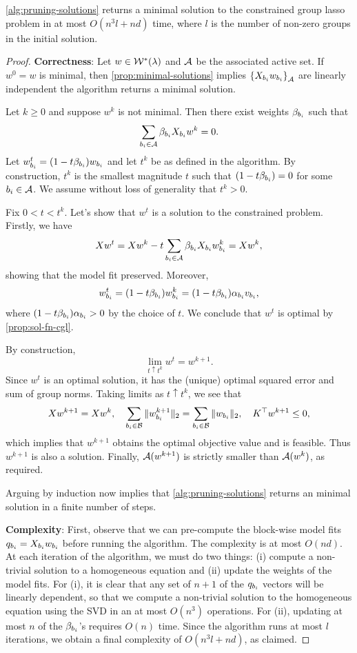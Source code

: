 \begin{proposition}\label{prop:pruning-correctness}
	\cref{alg:pruning-solutions} returns a minimal solution to the
	constrained group lasso problem in at most \( O(n^3l + nd) \)
	time, where \( l \) is the number of non-zero groups in the
	initial solution.
\end{proposition}
\begin{proof}
	\textbf{Correctness}:
	Let \( w \in \mathcal{W}^*(\lambda) \)
	and \( \mathcal{A} \) be the associated active set.
	If \( w^0 = w \) is minimal, then \cref{prop:minimal-solutions}
	implies \( \left\{X_{b_i} w_{b_i}\right\}_{\mathcal{A}} \) are linearly independent
	the algorithm returns a minimal solution.

	Let \( k \geq 0 \) and suppose \( w^k \) is not minimal.
	Then there exist weights \( \beta_{b_i} \) such that
	\[
		\sum_{{b_i} \in \mathcal{A}} \beta_{b_i} X_{b_i} w^k = 0.
	\]
	Let \( w_{b_i}^t = (1 - t \beta_{b_i}) w_{b_i} \) and let \( t^k \)
	be as defined in the algorithm.
	By construction, \( t^k \) is the smallest magnitude \( t \) such that
	\( (1 - t \beta_{b_i}) = 0 \) for some \( {b_i} \in \mathcal{A} \).
	We assume without loss of generality that \( t^k > 0 \).

	Fix \( 0 < t < t^k \). Let's show that \( w^t \) is a solution to the
	constrained problem.
	Firstly, we have
	\[
		X w^t = X w^k - t \sum_{{b_i} \in \mathcal{A}} \beta_{b_i} X_{b_i} w_{b_i}^k = X w^k,
	\]
	showing that the model fit preserved.
	Moreover,
	\[
		w_{b_i}^t = (1 - t \beta_{b_i}) w_{b_i}^k = (1 - t \beta_{b_i}) \alpha_{b_i} v_{b_i},
	\]
	where \( (1 - t \beta_{b_i}) \alpha_{b_i} > 0 \) by the choice of \( t \).
	We conclude that \( w^t \) is optimal by \cref{prop:sol-fn-cgl}.

	By construction,
	\[
		\lim_{t \uparrow t^k} w^t = w^{k+1}.
	\]
	Since \( w^t \) is an optimal solution,
	it has the (unique) optimal squared error and sum of group norms.
	Taking limits as \( t \uparrow t^k \),
	we see that
	\[
		X w^{k+1} = X w^k,
		\quad \sum_{{b_i} \in \mathcal{B}} \|w_{b_i}^{k+1}\|_2
		=
		\sum_{{b_i} \in \mathcal{B}} \|w_{b_i}\|_2,
		\quad
		K^\top w^{k+1} \leq 0,
	\]
	which implies that \( w^{k+1} \) obtains the optimal objective
	value and is feasible.
	Thus \( w^{k+1} \) is also a solution.
	Finally, \( \mathcal{A}(w^{k+1}) \) is strictly smaller than
	\( \mathcal{A}(w^k) \), as required.

	Arguing by induction now implies that \cref{alg:pruning-solutions}
	returns an minimal solution in a finite number of steps.

	\textbf{Complexity}:
	First, observe that we can pre-compute the block-wise model fits
	\( q_{b_i} = X_{b_i} w_{b_i} \) before running the
	algorithm. The complexity is at most \( O(nd) \).
	At each iteration of the algorithm, we must do two things: (i)
	compute a non-trivial solution to a homogeneous equation and (ii)
	update the weights of the model fits.
	For (i), it is clear that any set of \( n+1 \) of the \( q_{b_i} \) vectors
	will be linearly dependent, so that we compute a non-trivial
	solution to the homogeneous equation using the SVD in an at most
	\( O(n^3) \) operations.
	For (ii), updating at most \( n \) of the \( \beta_{{b_i}} \)'s
	requires \( O(n) \) time.
	Since the algorithm runs at most \( l \) iterations, we obtain a final
	complexity of \( O(n^3l + nd) \), as claimed.
\end{proof}

